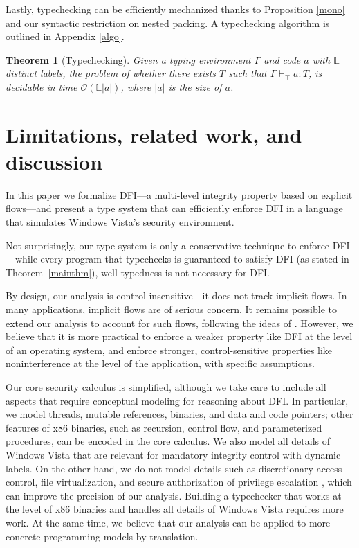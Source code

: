 \documentclass{sigplanconf}
\newtheorem{theorem}[definition]{Theorem}
\begin{document}
Lastly, typechecking can be efficiently mechanized thanks to Proposition \ref{mono} and our syntactic restriction on nested packing. 
A typechecking algorithm is outlined in Appendix \ref{algo}.
\begin{theorem}[Typechecking]\label{decide} Given a typing environment $\Gamma$ and code $a$ with $\mathbb L$ distinct labels, the problem of whether there exists $T$ such that $\Gamma \vdash_\top a : T$, is decidable in time $\mathcal O(\mathbb L |a|)$, where $|a|$ is the size of $a$.
\end{theorem}













\section{Limitations, related work, and discussion}\label{concl}


In this paper we formalize DFI---a multi-level integrity property based on explicit flows---and present a type system that can efficiently enforce DFI in a language that simulates Windows Vista's security environment. 

Not surprisingly, our type system is only a conservative technique to enforce
DFI---while every program that typechecks is guaranteed to
satisfy DFI (as stated in Theorem~\ref{mainthm}), 
well-typedness is not necessary for DFI. 


By design, our analysis is control-insensitive---it does not track implicit flows. In many applications, implicit flows are of serious concern. It remains possible to extend our analysis to account for such flows, following the ideas of \cite{vis,robustdeclass,myers04enforcing,lipopl}. However, we believe that it is more practical to enforce a weaker property like DFI at the level of an operating system, and enforce stronger, control-sensitive properties like noninterference at the level of the application, with specific assumptions. 

Our core security calculus is simplified,
although we take care to include all aspects that require conceptual modeling 
for reasoning
about DFI.
In particular, we model threads, mutable references, binaries, and data and code pointers; other features of x86 binaries, 
such as recursion, control flow, and parameterized procedures, can be encoded in the core calculus.
We also model all details of Windows Vista that are relevant for mandatory integrity control with dynamic labels. On the other hand, we do not model details 
such as discretionary access control, file virtualization, and secure authorization of privilege escalation \cite{bppvista}, which can improve the precision of our analysis.
Building a typechecker that works at the level of x86 binaries and handles
all details of Windows Vista requires more work. At the same time, we believe that our analysis can be applied to more concrete programming models by translation. 
\end{document}
